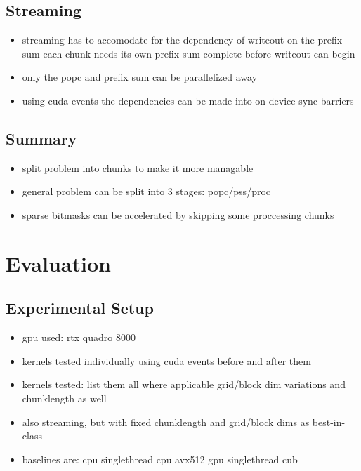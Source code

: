 \documentclass{tudscrartcl}
\begin{document}
		\subsection{Streaming}
			\begin{itemize}
				\item streaming has to accomodate for the dependency of writeout on the prefix sum
					\subitem each chunk needs its own prefix sum complete before writeout can begin
				\item only the popc and prefix sum can be parallelized away
				\item using cuda events the dependencies can be made into on device sync barriers
			\end{itemize}
		
		\subsection{Summary}
		
			\begin{itemize}
				\item split problem into chunks to make it more managable
				\item general problem can be split into 3 stages: popc/pss/proc
				\item sparse bitmasks can be accelerated by skipping some proccessing chunks
			\end{itemize}
		
	\section{Evaluation}
	
		\subsection{Experimental Setup}
			\begin{itemize}
				\item gpu used: rtx quadro 8000
				\item kernels tested individually using cuda events before and after them
				\item kernels tested: list them all
					\subitem where applicable grid/block dim variations and chunklength as well
				\item also streaming, but with fixed chunklength and grid/block dims as best-in-class
				\item baselines are:
					\subitem cpu singlethread
					\subitem cpu avx512
					\subitem gpu singlethread
					\subitem cub
			\end{itemize}
		
\end{document}
